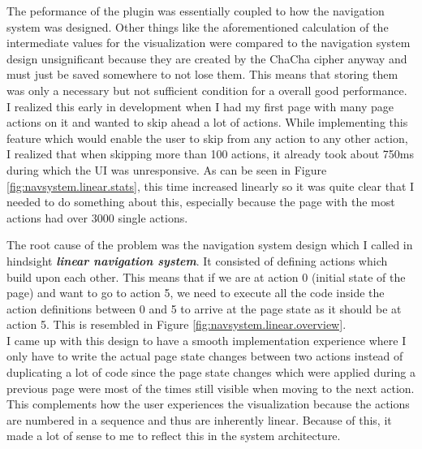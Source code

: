 The peformance of the plugin was essentially coupled to how the navigation system was designed. Other things like the aforementioned calculation of the intermediate values for the visualization were compared to the navigation system design unsignificant because they are created by the ChaCha cipher anyway and must just be saved somewhere to not lose them. This means that storing them was only a necessary but not sufficient condition for a overall good performance. \\
I realized this early in development when I had my first page with many page actions on it and wanted to skip ahead a lot of actions. While implementing this feature which would enable the user to skip from any action to any other action, I realized that when skipping more than 100 actions, it already took about 750ms during which the UI was unresponsive. As can be seen in Figure \ref{fig:navsystem.linear.stats}, this time increased linearly so it was quite clear that I needed to do something about this, especially because the page with the most actions had over 3000 single actions.

The root cause of the problem was the navigation system design which I called in hindsight \textbf{\textit{linear navigation system}}. It consisted of defining actions which build upon each other. This means that if we are at action 0 (initial state of the page) and want to go to action 5, we need to execute all the code inside the action definitions between 0 and 5 to arrive at the page state as it should be at action 5. This is resembled in Figure \ref{fig:navsystem.linear.overview}. \\
I came up with this design to have a smooth implementation experience where I only have to write the actual page state changes between two actions instead of duplicating a lot of code since the page state changes which were applied during a previous page were most of the times still visible when moving to the next action. This complements how the user experiences the visualization because the actions are numbered in a sequence and thus are inherently linear. Because of this, it made a lot of sense to me to reflect this in the system architecture.

